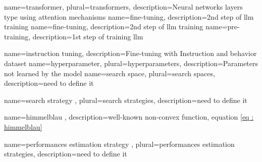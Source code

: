 

{
    name=transformer,
    plural=transformers,
    description={Neural networks layers type using attention mechanisms}
}
{
    name=fine-tuning,
    description={2nd step of \acrshort{llm} training}
}
{%
    name=fine-tuning,
    description={2nd step of \acrshort{llm} training}
}
{%
    name=pre-training,
    description={1st step of training \acrshort{llm}}
}

{
    name=instruction tuning,
    description={Fine-tuning with Instruction and behavior dataset}
}
{
    name=hyperparameter,
    plural=hyperparameters,
    description={Parameters not learned by the model}
}
{%
    name=search space,
    plural=search spaces,
    description={need to define it}
}

{%
    name=search strategy ,
    plural=search strategies,
    description={need to define it}
}

{%
    name=himmelblau ,
    description={well-known non-convex function, equation \ref{eq : himmelblau} }
}

{
    name=performances estimation strategy ,
    plural=performances estimation strategies,
    description={need to define it}
}

